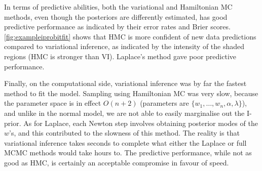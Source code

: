 In terms of predictive abilities, both the variational and Hamiltonian MC methods, even though the posteriors are differently estimated, has good predictive performance as indicated by their error rates and Brier scores.
\cref{fig:exampleiprobitfit} shows that HMC is more confident of new data predictions compared to variational inference, as indicated by the intensity of the shaded regions (HMC is stronger than VI).
Laplace's method gave poor predictive performance.

Finally, on the computational side, variational inference was by far the fastest method to fit the model.
Sampling using Hamiltonian MC was very slow, because the parameter space is in effect $O(n + 2)$ (parameters are $\{w_1,\dots,w_n,\alpha,\lambda\}$), and unlike in the normal model, we are not able to easily marginalise out the I-prior.
As for Laplace, each Newton step involves obtaining posterior modes of the $w$'s, and this contributed to the slowness of this method.
The reality is that variational inference takes seconds to complete what either the Laplace or full MCMC methods would take hours to.
The predictive performance, while not as good as HMC, is certainly an acceptable compromise in favour of speed.

